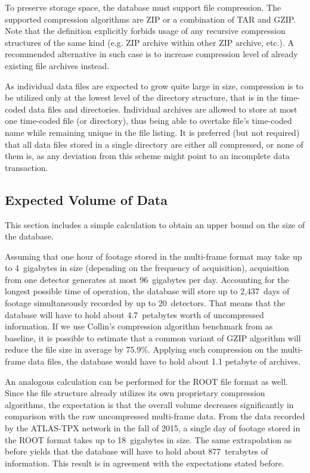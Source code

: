 
To preserve storage space, the database must support file compression. The supported compression algorithms are ZIP or a combination of TAR and GZIP. Note that the definition explicitly forbids usage of any recursive compression structures of the same kind (e.g. ZIP archive within other ZIP archive, etc.). A recommended alternative in such case is to increase compression level of already existing file archives instead.

As individual data files are expected to grow quite large in size, compression is to be utilized only at the lowest level of the directory structure, that is in the time-coded data files and directories. Individual archives are allowed to store at most one time-coded file (or directory), thus being able to overtake file's time-coded name while remaining unique in the file listing. It is preferred (but not required) that all data files stored in a single directory are either all compressed, or none of them is, as any deviation from this scheme might point to an incomplete data transaction.

\subsection{Expected Volume of Data}
This section includes a simple calculation to obtain an upper bound on the size of the database.

Assuming that one hour of footage stored in the multi-frame format may take up to 4~gigabytes in size (depending on the frequency of acquisition), acquisition from one detector generates at most 96~gigabytes per day. Accounting for the longest possible time of operation, the database will store up to 2,437~days of footage simultaneously recorded by up to 20~detectors. That means that the database will have to hold about 4.7~petabytes worth of uncompressed information. If we use Collin's compression algorithm benchmark from \cite{GzipBenchmark} as baseline, it is possible to estimate that a common variant of GZIP algorithm will reduce the file size in average by 75.9\%. Applying such compression on the multi-frame data files, the database would have to hold about 1.1 petabyte of archives.

An analogous calculation can be performed for the ROOT file format as well. Since the file structure already utilizes its own proprietary compression algorithms, the expectation is that the overall volume decreases significantly in comparison with the raw uncompressed multi-frame data. From the data recorded by the ATLAS-TPX network in the fall of 2015, a single day of footage stored in the ROOT format takes up to 18~gigabytes in size. The same extrapolation as before yields that the database will have to hold about 877~terabytes of information. This result is in agreement with the expectations stated before.

